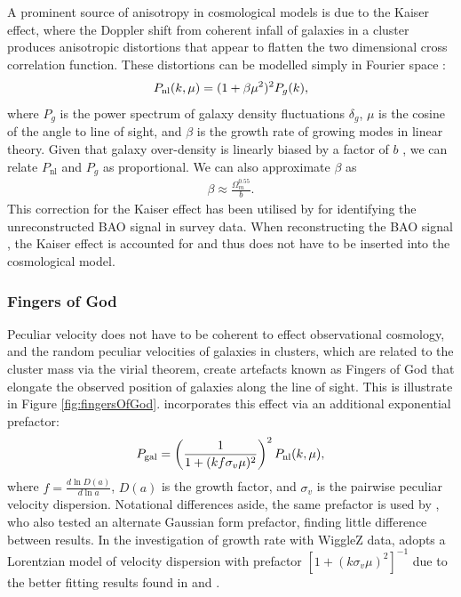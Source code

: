 \documentclass[titlesmallcaps, examinerscopy, copyrightpage]{uqthesis}
\begin{document}
A prominent source of anisotropy in cosmological models is due to the Kaiser effect, where the Doppler shift from coherent infall of galaxies in a cluster produces anisotropic distortions that appear to flatten the two dimensional cross correlation function. These distortions can be modelled simply in Fourier space \citep{Kaiser1987}:
\begin{align} \label{eq:gaztanga1}
P_{\rm{nl}}(k, \mu) = (1 + \beta \mu^2)^2 P_{g}(k),
\end{align}
where $P_{g}$ is the power spectrum of galaxy density fluctuations $\delta_g$, $\mu$ is the cosine of the angle to line of sight, and $\beta$ is the growth rate of growing modes in linear theory. Given that galaxy over-density is linearly biased by a factor of $b$ \citep{ReidSpergelBode2009}, we can relate $P_{\text{nl}}$ and $P_{g}$ as proportional. We can also approximate $\beta$ as \citep{Linder2005}
\begin{align}
\beta \approx \frac{\Omega_m^{0.55}}{b}.
\end{align}
This correction for the Kaiser effect has been utilised by \citet{ChuangWang2012, XuPadmanabhan2012, Gaztanaga2009} for identifying the unreconstructed BAO signal in survey data. When reconstructing the BAO signal \citep[see][for details]{KazinKoda2014,PadmanabhanXuEisenstein2012}, the Kaiser effect is accounted for and thus does not have to be inserted into the cosmological model.



\subsubsection{Fingers of God}

Peculiar velocity does not have to be coherent to effect observational cosmology, and the random peculiar velocities of galaxies in clusters, which are related to the cluster mass via the virial theorem, create artefacts known as Fingers of God that elongate the observed position of galaxies along the line of sight. This is illustrate in Figure \ref{fig:fingersOfGod}. \citet{SanchezKazinBeutler2013} incorporates this effect via an additional exponential prefactor:
\begin{align}
P_{\rm{gal}} = \left( \frac{1}{1 + (k f \sigma_v \mu )^2} \right)^2  P_{\rm{nl}}(k, \mu), \label{eq:lorentzian}
\end{align}
where $f = \frac{d \ln D(a)}{d \ln a}$, $D(a)$ is the growth factor, and $\sigma_v$ is the pairwise peculiar velocity dispersion. Notational differences aside, the same prefactor is used by \citet{XuPadmanabhan2012}, who also tested an alternate Gaussian form prefactor, finding little difference between results. In the investigation of growth rate with WiggleZ data, \citet{BlakeBroughColless2011} adopts a Lorentzian model of velocity dispersion with prefactor $[1 + (k \sigma_v \mu)^2]^{-1}$ due to the better fitting results found in \citet{HawkinsMaddoxCole2003} and \citet{CabreGaztanaga2009}.
\end{document}
